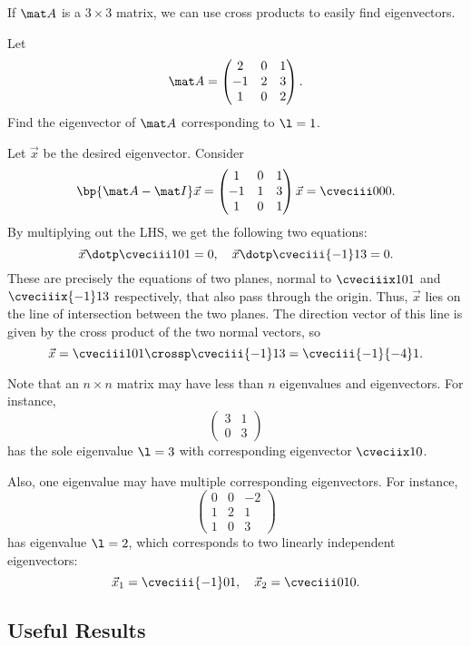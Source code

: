 If $\mat A$ is a $3 \times 3$ matrix, we can use cross products to easily find eigenvectors.

\begin{sample}
    Let \[\mat A = \begin{pmatrix}2 & 0 & 1 \\ -1 & 2 & 3 \\ 1 & 0 & 2\end{pmatrix}.\] Find the eigenvector of $\mat A$ corresponding to $\l = 1$.
\end{sample}
\begin{sample}
    Let $\vec x$ be the desired eigenvector. Consider \[\bp{\mat A - \mat I} \vec x = \begin{pmatrix}1 & 0 & 1 \\ -1 & 1 & 3 \\ 1 & 0 & 1\end{pmatrix} \vec x = \cveciii000.\] By multiplying out the LHS, we get the following two equations: \[\vec x \dotp \cveciii101 = 0, \quad \vec x \dotp \cveciii{-1}13 = 0.\] These are precisely the equations of two planes, normal to $\cveciiix101$ and $\cveciiix{-1}13$ respectively, that also pass through the origin. Thus, $\vec x$ lies on the line of intersection between the two planes. The direction vector of this line is given by the cross product of the two normal vectors, so \[\vec x = \cveciii101 \crossp \cveciii{-1}13 = \cveciii{-1}{-4}1.\]
\end{sample}

Note that an $n \times n$ matrix may have less than $n$ eigenvalues and eigenvectors. For instance, \[\begin{pmatrix}3 & 1 \\ 0 & 3\end{pmatrix}\] has the sole eigenvalue $\l = 3$ with corresponding eigenvector $\cveciix10$.

Also, one eigenvalue may have multiple corresponding eigenvectors. For instance, \[\begin{pmatrix}0 & 0 & -2 \\ 1 & 2 & 1 \\ 1 & 0 & 3\end{pmatrix}\] has eigenvalue $\l = 2$, which corresponds to two linearly independent eigenvectors: \[\vec x_1 = \cveciii{-1}01, \quad \vec x_2 = \cveciii010.\]

\subsection{Useful Results}


